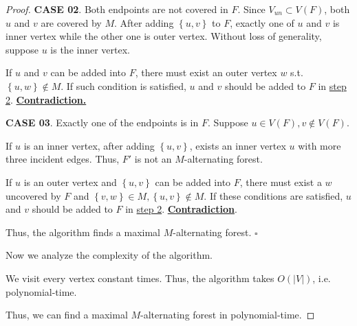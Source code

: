 \documentclass{article}
\newcommand{\whiteqed}{\hfill $\square$\par}
\newcommand{\set}[1]{\left\{#1\right\}}
\begin{document}
\begin{proof}
    \hspace{1.3em}
    \textbf{CASE 02}. Both endpoints are not covered in $F$. Since $V_{un}\subset V(F)$, both $u$ and $v$ are covered by $M$. After adding $\set{u,v}$ to $F$, exactly one of $u$ and $v$ is inner vertex while the other one is outer vertex. Without loss of generality, suppose $u$ is the inner vertex. 
    
    \hspace{1.3em}
    If $u$ and $v$ can be added into $F$, there must exist an outer vertex $w$ s.t. $\set{u,w}\notin M$. If such condition is satisfied, $u$ and $v$ should be added to $F$ in \underline{step 2}. \underline{\textbf{Contradiction.}}
    
    \hspace{1.3em}
    \textbf{CASE 03}. Exactly one of the endpoints is in $F$. Suppose $u\in V(F), v\notin V(F)$. 
    
    \hspace{1.3em}
    If $u$ is an inner vertex, after adding $\set{u,v}$, exists an inner vertex $u$ with more three incident edges. Thus, $F'$ is not an $M$-alternating forest.
    
    \hspace{1.3em}
    If $u$ is an outer vertex and $\set{u,v}$ can be added into $F$, there must exist a $w$ uncovered by $F$ and $\set{v,w}\in M, \set{u,v}\notin M$. If these conditions are satisfied, $u$ and $v$ should be added to $F$ in \underline{step 2}. \underline{\textbf{Contradiction}}.
    
    \vspace{1em} \hspace{1.3em}
    Thus, the algorithm finds a maximal $M$-alternating forest. \whiteqed
    
    \vspace{1.5em} \hspace{1.3em}
    Now we analyze the complexity of the algorithm.
    
    \hspace{1.3em}
    We visit every vertex constant times. Thus, the algorithm takes $O(|V|)$, i.e. polynomial-time.
    
    \hspace{1.3em}
    Thus, we can find a maximal $M$-alternating forest in polynomial-time.
\end{proof}

\vspace{1em}
\end{document}

